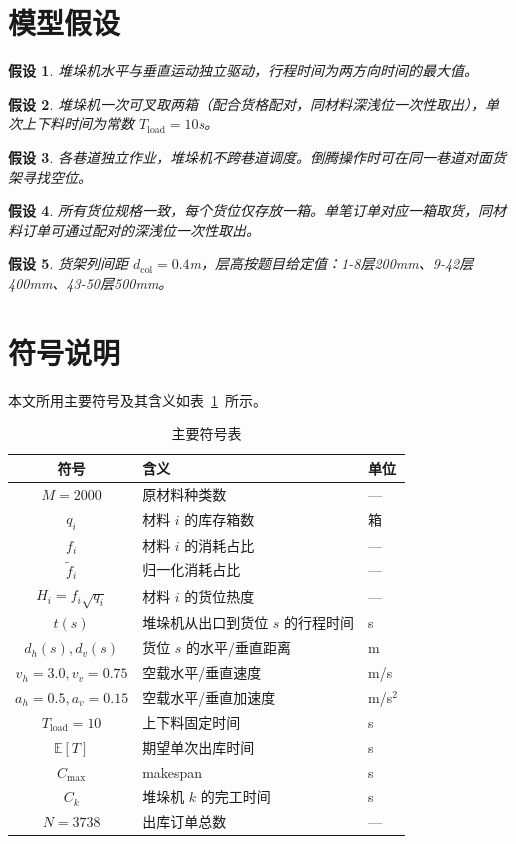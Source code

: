 \documentclass[a4paper]{cumcmthesis}
\newcommand{\headcol}{\rowcolor{tableheadcolor}}
\newtheorem{assumption}{假设}[section]
\newcommand{\E}[1]{\mathbb{E}\left[#1\right]}
\newcommand{\ftilde}{\tilde{f}}
\begin{document}
\section{模型假设}

\begin{assumption}
堆垛机水平与垂直运动独立驱动，行程时间为两方向时间的最大值。
\end{assumption}

\begin{assumption}
堆垛机一次可叉取两箱（配合货格配对，同材料深浅位一次性取出），单次上下料时间为常数 $T_{\text{load}}=10$s。
\end{assumption}

\begin{assumption}
各巷道独立作业，堆垛机不跨巷道调度。倒腾操作时可在同一巷道对面货架寻找空位。
\end{assumption}

\begin{assumption}
所有货位规格一致，每个货位仅存放一箱。单笔订单对应一箱取货，同材料订单可通过配对的深浅位一次性取出。
\end{assumption}

\begin{assumption}
货架列间距 $d_{\text{col}}=0.4$m，层高按题目给定值：1-8层200mm、9-42层400mm、43-50层500mm。
\end{assumption}

\section{符号说明}
本文所用主要符号及其含义如表~\ref{tab:symbols}~所示。

\begin{table}[H]
\centering\small
\caption{主要符号表}
\label{tab:symbols}
\begin{tabular}{cll}
\toprule
\headcol 符号 & 含义 & 单位 \\
\midrule
$M=2000$ & 原材料种类数 & --- \\
$q_i$ & 材料 $i$ 的库存箱数 & 箱 \\
$f_i$ & 材料 $i$ 的消耗占比 & --- \\
$\ftilde_i$ & 归一化消耗占比 & --- \\
$H_i=f_i\sqrt{q_i}$ & 材料 $i$ 的货位热度 & --- \\
$t(s)$ & 堆垛机从出口到货位 $s$ 的行程时间 & s \\
$d_h(s), d_v(s)$ & 货位 $s$ 的水平/垂直距离 & m \\
$v_h=3.0, v_v=0.75$ & 空载水平/垂直速度 & m/s \\
$a_h=0.5, a_v=0.15$ & 空载水平/垂直加速度 & m/s$^2$ \\
$T_{\text{load}}=10$ & 上下料固定时间 & s \\
$\E{T}$ & 期望单次出库时间 & s \\
$C_{\max}$ & makespan & s \\
$C_k$ & 堆垛机 $k$ 的完工时间 & s \\
$N=3738$ & 出库订单总数 & --- \\
\bottomrule
\end{tabular}
\end{table}
\end{document}
